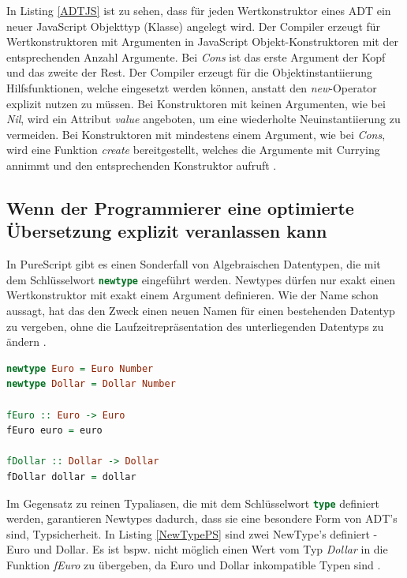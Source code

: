 \documentclass[
12pt,
ngerman,
oneside]
{scrbook} %
\begin{document}
In Listing \ref{ADTJS} ist zu sehen, dass für jeden Wertkonstruktor eines ADT ein neuer JavaScript Objekttyp (Klasse) angelegt wird. Der Compiler erzeugt für Wertkonstruktoren mit Argumenten in JavaScript Objekt-Konstruktoren mit der entsprechenden Anzahl Argumente. Bei \emph{Cons} ist das erste Argument der Kopf und das zweite der Rest. Der Compiler erzeugt für die Objektinstantiierung Hilfsfunktionen, welche eingesetzt werden können, anstatt den  \emph{new}-Operator explizit nutzen zu müssen. Bei Konstruktoren mit keinen Argumenten, wie bei \emph{Nil}, wird ein Attribut \emph{value} angeboten, um eine wiederholte Neuinstantiierung zu vermeiden. Bei Konstruktoren mit mindestens einem Argument, wie bei \emph{Cons}, wird eine Funktion \emph{create} bereitgestellt, welches die Argumente mit Currying annimmt und den entsprechenden Konstruktor aufruft \cite[][S. 145--146]{Freeman17}.

\subsection{Wenn der Programmierer eine optimierte Übersetzung explizit veranlassen kann}
In PureScript gibt es einen Sonderfall von Algebraischen Datentypen, die mit dem Schlüsselwort \lstinline[language=purescript, columns=fixed]{newtype} eingeführt werden. Newtypes dürfen nur exakt einen Wertkonstruktor mit exakt einem Argument definieren. Wie der Name schon aussagt, hat das den Zweck einen neuen Namen für einen bestehenden Datentyp zu vergeben, ohne die Laufzeitrepräsentation des unterliegenden Datentyps zu ändern \cite[][S. 60]{Freeman17}.

\begin{lstlisting}[language=purescript, style=numbered-and-boxed, caption=Beispiel Newtypes, label=NewTypePS]
newtype Euro = Euro Number
newtype Dollar = Dollar Number

fEuro :: Euro -> Euro
fEuro euro = euro

fDollar :: Dollar -> Dollar
fDollar dollar = dollar
\end{lstlisting}

Im Gegensatz zu reinen Typaliasen, die mit dem Schlüsselwort \lstinline[language=purescript, columns=fixed]{type} definiert werden, garantieren Newtypes dadurch, dass sie eine besondere Form von ADT's sind, Typsicherheit. In Listing \ref{NewTypePS} sind zwei NewType's definiert - Euro und Dollar. Es ist bspw. nicht möglich einen Wert vom Typ \emph{Dollar} in die Funktion \emph{fEuro} zu übergeben, da Euro und Dollar inkompatible Typen sind \cite[][S. 60]{Freeman17}.
\end{document}
